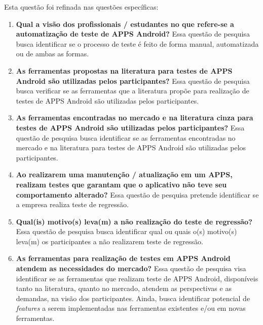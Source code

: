 \vspace{.5em}

Esta questão foi refinada nas questões específicas:
\vspace{.5em}

\begin{enumerate}[label=\bf QP\arabic*,leftmargin=1.8cm]
    
    \item \textbf{Qual a visão dos profissionais / estudantes no que refere-se a automatização de teste de \ac{APPS} Android?} Essa questão de pesquisa busca identificar se o processo de teste é feito de forma manual, automatizada ou de ambas as formas.
    
    \item \textbf{As ferramentas propostas na literatura para testes de \ac{APPS} Android são utilizadas pelos participantes?} Essa questão de pesquisa busca verificar se as ferramentas que a literatura propõe para realização de testes de \ac{APPS} Android são utilizadas pelos participantes.
    
    \item \textbf{As ferramentas encontradas no mercado e na literatura cinza para testes de \ac{APPS} Android são utilizadas pelos participantes?} Essa questão de pesquisa busca identificar se as ferramentas encontradas no mercado e na literatura para testes de \ac{APPS} Android são utilizadas pelos participantes.
    
    \item \textbf{Ao realizarem uma manutenção / atualização em um \ac{APPS}, realizam testes que garantam que o aplicativo não teve seu comportamento alterado?} Essa questão de pesquisa pretende identificar se a empresa realiza teste de regressão.
    
    \item \textbf{Qual(is) motivo(s) leva(m) a não realização do teste de regressão?} Essa questão de pesquisa busca identificar qual ou quais o(s) motivo(s) leva(m) os participantes a não realizarem teste de regressão.
    
    \item \textbf{As ferramentas para realização de testes em \ac{APPS} Android atendem as necessidades do mercado?} Essa questão de pesquisa visa identificar se as ferramentas que realizam teste de \ac{APPS} Android, disponíveis tanto na literatura, quanto no mercado, atendem as perspectivas e as demandas, na visão dos participantes. Ainda, busca identificar potencial de \textit{features} a serem implementadas nas ferramentas existentes e/ou em novas ferramentas.
    
\end{enumerate}



